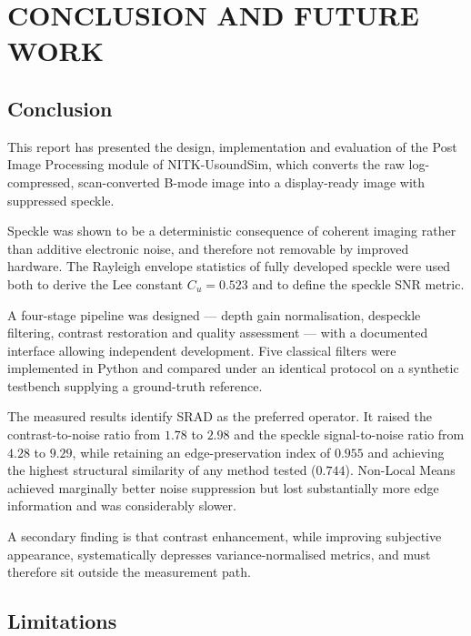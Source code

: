 \documentclass[12pt,a4paper,oneside]{report}
\begin{document}
\chapter{CONCLUSION AND FUTURE WORK}
\label{ch:conclusion}

\section{Conclusion}

This report has presented the design, implementation and evaluation of the Post
Image Processing module of NITK-UsoundSim, which converts the raw log-compressed,
scan-converted B-mode image into a display-ready image with suppressed speckle.

Speckle was shown to be a deterministic consequence of coherent imaging rather
than additive electronic noise, and therefore not removable by improved hardware.
The Rayleigh envelope statistics of fully developed speckle were used both to
derive the Lee constant $C_u = 0.523$ and to define the speckle SNR metric.

A four-stage pipeline was designed --- depth gain normalisation, despeckle
filtering, contrast restoration and quality assessment --- with a documented
interface allowing independent development. Five classical filters were
implemented in Python and compared under an identical protocol on a synthetic
testbench supplying a ground-truth reference.

The measured results identify SRAD as the preferred operator. It raised the
contrast-to-noise ratio from $1.78$ to $2.98$ and the speckle signal-to-noise
ratio from $4.28$ to $9.29$, while retaining an edge-preservation index of
$0.955$ and achieving the highest structural similarity of any method tested
($0.744$). Non-Local Means achieved marginally better noise suppression but lost
substantially more edge information and was considerably slower.

A secondary finding is that contrast enhancement, while improving subjective
appearance, systematically depresses variance-normalised metrics, and must
therefore sit outside the measurement path.

\section{Limitations}
\end{document}
